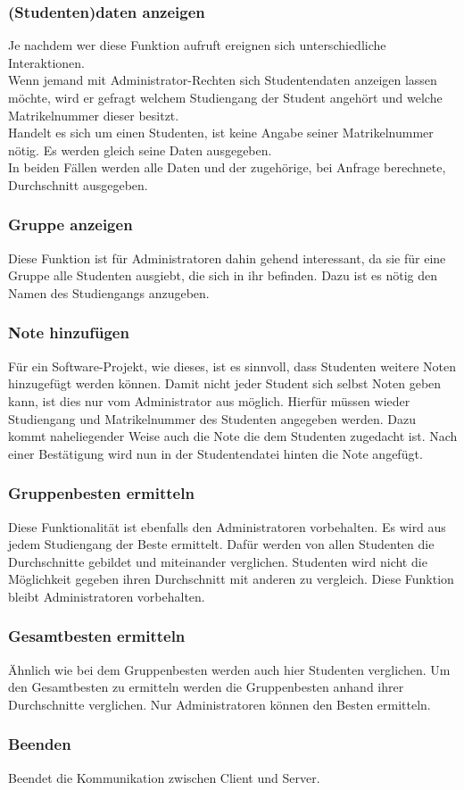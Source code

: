 \documentclass{scrartcl}
\begin{document}
		\subsubsection{(Studenten)daten anzeigen}
			Je nachdem wer diese Funktion aufruft ereignen sich unterschiedliche Interaktionen. \\
			Wenn jemand mit Administrator-Rechten sich Studentendaten anzeigen lassen möchte, wird er gefragt welchem Studiengang der Student angehört und welche Matrikelnummer dieser besitzt.\\
			Handelt es sich um einen Studenten, ist keine Angabe seiner Matrikelnummer nötig. Es werden gleich seine Daten ausgegeben.\\
			In beiden Fällen werden alle Daten und der zugehörige, bei Anfrage berechnete, Durchschnitt ausgegeben.
		\subsubsection{Gruppe anzeigen}
			Diese Funktion ist für Administratoren dahin gehend interessant, da sie für eine Gruppe alle Studenten ausgiebt, die sich in ihr befinden. Dazu ist es nötig den Namen des Studiengangs anzugeben.
		\subsubsection{Note hinzufügen}
			Für ein Software-Projekt, wie dieses, ist es sinnvoll, dass Studenten weitere Noten hinzugefügt werden können. Damit nicht jeder Student sich selbst Noten geben kann, ist dies nur vom Administrator aus möglich. Hierfür müssen wieder Studiengang und Matrikelnummer des Studenten angegeben werden. Dazu kommt naheliegender Weise auch die Note die dem Studenten zugedacht ist. Nach einer Bestätigung wird nun in der Studentendatei hinten die Note angefügt.
		\subsubsection{Gruppenbesten ermitteln}
			Diese Funktionalität ist ebenfalls den Administratoren vorbehalten. Es wird aus jedem Studiengang der Beste ermittelt. Dafür werden von allen Studenten die Durchschnitte gebildet und miteinander verglichen. Studenten wird nicht die Möglichkeit gegeben ihren Durchschnitt mit anderen zu vergleich. Diese Funktion bleibt Administratoren vorbehalten.
		\subsubsection{Gesamtbesten ermitteln}
			Ähnlich wie bei dem Gruppenbesten werden auch hier Studenten verglichen. Um den Gesamtbesten zu ermitteln werden die Gruppenbesten anhand ihrer Durchschnitte verglichen. Nur Administratoren können den Besten ermitteln.
		\subsubsection{Beenden}
			Beendet die Kommunikation zwischen Client und Server. 
\end{document}
